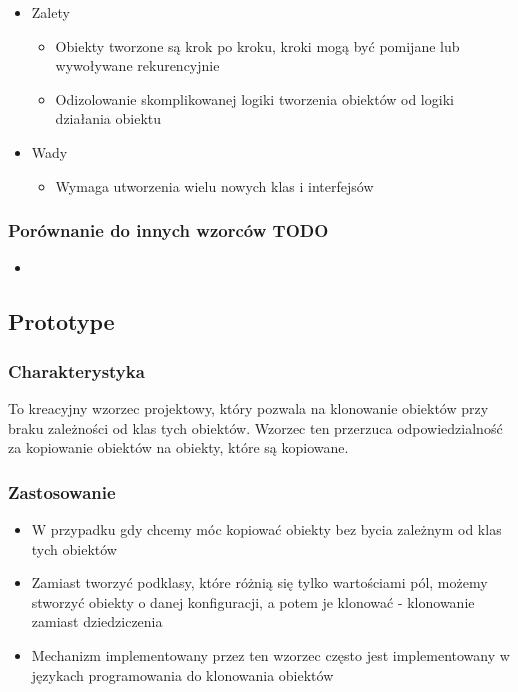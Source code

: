 \documentclass[a4paper,15pt]{article}
\begin{document}
\begin{itemize}
\item Zalety
\begin{itemize}
\item Obiekty tworzone są krok po kroku, kroki mogą być pomijane lub wywoływane rekurencyjnie
\item Odizolowanie skomplikowanej logiki tworzenia obiektów od logiki działania obiektu
\end{itemize}
\item Wady
\begin{itemize}
\item Wymaga utworzenia wielu nowych klas i interfejsów 
\end{itemize}
\end{itemize}


\subsubsection{Porównanie do innych wzorców TODO}
\begin{itemize}
\item
\end{itemize}


\newpage
\subsection{Prototype}

\subsubsection{Charakterystyka}
To kreacyjny wzorzec projektowy, który pozwala na klonowanie obiektów przy braku zależności od klas tych obiektów. Wzorzec ten przerzuca odpowiedzialność za kopiowanie obiektów na obiekty, które są kopiowane. 

\subsubsection{Zastosowanie}
\begin{itemize}
\item W przypadku gdy chcemy móc kopiować obiekty bez bycia zależnym od klas tych obiektów
\item Zamiast tworzyć podklasy, które różnią się tylko wartościami pól, możemy stworzyć obiekty o danej konfiguracji, a potem je klonować - klonowanie zamiast dziedziczenia
\item Mechanizm implementowany przez ten wzorzec często jest implementowany w językach programowania do klonowania obiektów
\end{itemize}
\end{document}
